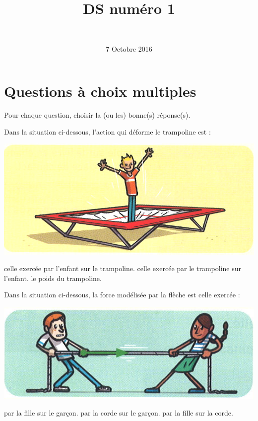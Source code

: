 \documentclass[a4paper,11pt]{exam}
\author{\ }
\date{7 Octobre 2016}
\title{DS num\'ero 1}
\begin{document}
%	

	\maketitle
	
\section{Questions à choix multiples}
Pour chaque question, choisir la (ou les) bonne(s) réponse(s).

\begin{questions}
	\question Dans la situation ci-dessous, l'action qui déforme le trampoline est :
	
	\begin{multicols}{2}
	
		\begin{center}
			\includegraphics[scale=0.3]{trampo}	
		\end{center}
	
	
		\begin{checkboxes}
			\choice celle exercée par l'enfant sur le trampoline.
			\choice celle exercée par le trampoline sur l'enfant.
			\choice le poids du trampoline.
		\end{checkboxes}
	\end{multicols}
	\question Dans la situation ci-dessous, la force modélisée par la flèche est celle exercée :
	
	\begin{multicols}{2}
		
			
		\begin{center}
			\includegraphics[scale=0.3]{corde}
		\end{center}
		\begin{checkboxes}
			\choice par la fille sur le garçon.
			\choice par la corde sur le garçon.
			\choice par la fille sur la corde.
		\end{checkboxes}
		

\end{multicols}
\end{questions}
\end{document}
